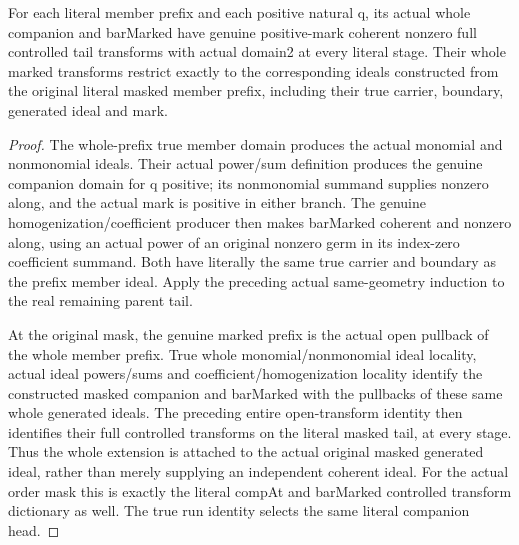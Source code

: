 \begin{theorem}
\label{hir:member-companion-actual-entire-mask-identity}
\leanok
For each literal member prefix and each positive natural q, its actual whole
companion and barMarked have genuine positive-mark coherent nonzero full
controlled tail transforms with actual domain2 at every literal stage.
Their whole marked transforms restrict exactly to the corresponding ideals
constructed from the original literal masked member prefix, including their
true carrier, boundary, generated ideal and mark.
\end{theorem}
\begin{proof}
The whole-prefix true member domain produces the actual monomial and
nonmonomial ideals. Their actual power/sum definition produces the genuine
companion domain for q positive; its nonmonomial summand supplies nonzero
along, and the actual mark is positive in either branch. The genuine
homogenization/coefficient producer then makes barMarked coherent and nonzero
along, using an actual power of an original nonzero germ in its index-zero
coefficient summand. Both have literally the same true carrier and boundary
as the prefix member ideal. Apply the preceding actual same-geometry induction
to the real remaining parent tail.

At the original mask, the genuine marked prefix is the actual open pullback
of the whole member prefix. True whole monomial/nonmonomial ideal locality,
actual ideal powers/sums and coefficient/homogenization locality identify the
constructed masked companion and barMarked with the pullbacks of these same
whole generated ideals. The preceding entire open-transform identity then
identifies their full controlled transforms on the literal masked tail, at
every stage. Thus the whole extension is attached to the actual original
masked generated ideal, rather than merely supplying an independent coherent
ideal. For the actual order mask this is exactly the literal compAt and
barMarked controlled transform dictionary as well. The true run identity
selects the same literal companion head.
\end{proof}

